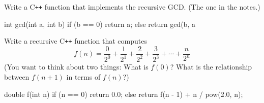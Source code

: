 \nextq
Write a C\texttt{++} function that implements the recursive GCD.
(The one in the notes.)
\\
\ANSWER
\begin{answercode}
int gcd(int a, int b)
{
  if (b == 0) return a;
  else return gcd(b, a %
}
\end{answercode}

\nextq
Write a recursive C\texttt{++} function that computes
\[
f(n) = \frac{0}{2^0} + \frac{1}{2^1} + \frac{2}{2^2} + \frac{3}{2^3}
+ \cdots + \frac{n}{2^n}
\]
(You want to think about two things:
What is $f(0)$?
What is the relationship between $f(n+1)$ in terms of $f(n)$?)
\\
\ANSWER
\begin{answercode}
double f(int n)
{
  if (n == 0) return 0.0;
  else return f(n - 1) + n / pow(2.0, n);
}
\end{answercode}


